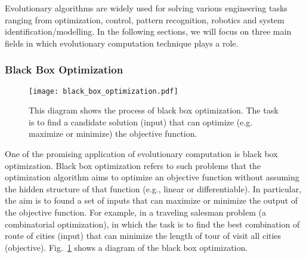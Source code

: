 Evolutionary algorithms are widely used for solving various engineering tasks ranging from optimization, control, pattern recognition, robotics and system identification/modelling. In the following sections, we will focus on three main fields in which evolutionary computation technique plays a role. 

\subsubsection{Black Box Optimization}

\begin{figure}[!t]
  \centering
  \texttt{[image: black\_box\_optimization.pdf]}
  \caption{This diagram shows the process of black box optimization. The task is to find a candidate solution (input) that can optimize (e.g. maximize or minimize) the objective function.}
  \label{fig:black_box_optimization}
\end{figure}

One of the promising application of evolutionary computation is black box optimization. Black box optimization refers to such problems that the optimization algorithm aims to optimize an objective function without assuming the hidden structure of that function (e.g., linear or differentiable). In particular, the aim is to found a set of inputs that can maximize or minimize the output of the objective function. For example, in a traveling salesman problem (a combinatorial optimization), in which the task is to find the best combination of route of cities (input) that can minimize the length of tour of visit all cities (objective). Fig.~\ref{fig:black_box_optimization} shows a diagram of the black box optimization.

